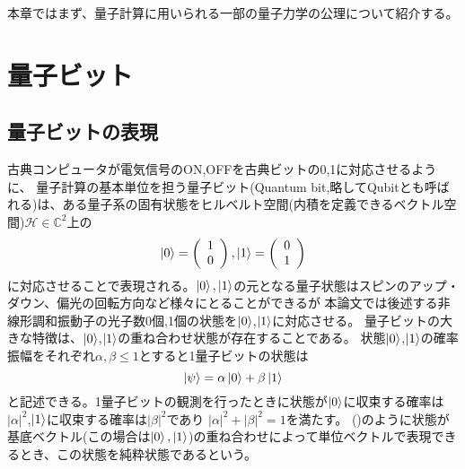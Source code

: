     本章ではまず、量子計算に用いられる一部の量子力学の公理について紹介する。
\section{量子ビット}
    \subsection{量子ビットの表現}
        古典コンピュータが電気信号のON,OFFを古典ビットの0,1に対応させるように、
        量子計算の基本単位を担う量子ビット(Quantum bit,略してQubitとも呼ばれる)は、ある量子系の固有状態をヒルベルト空間(内積を定義できるベクトル空間)$\mathcal{H}\in\mathbb{C}^2$上の
        \begin{equation}
            \ket{0}=\left(
                \begin{array}{c}
                  1\\
                  0\\
                \end{array}
              \right)
            ,
            \ket{1}=\left(
                \begin{array}{c}
                  0\\
                  1\\
                \end{array}
              \right)
        \end{equation}
        に対応させることで表現される。$\ket{0},\ket{1}$の元となる量子状態はスピンのアップ・ダウン、偏光の回転方向など様々にとることができるが
        本論文では後述する非線形調和振動子の光子数0個,1個の状態を$\ket{0}$,$\ket{1}$に対応させる。
        量子ビットの大きな特徴は、$\ket{0}$,$\ket{1}$の重ね合わせ状態が存在することである。
        状態$\ket{0}$,$\ket{1}$の確率振幅をそれぞれ$\alpha,\beta \leq 1$とすると1量子ビットの状態は
        \begin{equation}
            \ket{\psi}=\alpha\ket{0}+\beta\ket{1}
        \end{equation}
        と記述できる。1量子ビットの観測を行ったときに状態が$\ket{0}$に収束する確率は$|\alpha|^2$,$\ket{1}$に収束する確率は$|\beta|^2$であり
        $|\alpha|^2+|\beta|^2=1$を満たす。
        ()のように状態が基底ベクトル(この場合は{$\ket{0},\ket{1}$})の重ね合わせによって単位ベクトルで表現できるとき、この状態を純粋状態であるという。
        
